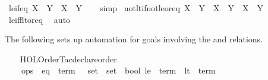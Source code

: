 \begin{isabellebody}
\isamarkupfalse%
\ le{\isacharunderscore}{\kern0pt}if{\isacharunderscore}{\kern0pt}eq{\isacharcolon}{\kern0pt}\ {\isachardoublequoteopen}X\ {\isacharequal}{\kern0pt}\ Y\ {\isasymLongrightarrow}\ X\ {\isasymle}\ Y{\isachardoublequoteclose}\isanewline
%
\isadelimproof
\ \ %
\endisadelimproof
%
\isatagproof
{}\isamarkupfalse%
\ simp%
\endisatagproof
{\isafoldproof}%
%
\isadelimproof
\isanewline
%
\endisadelimproof
\isanewline
{}\isamarkupfalse%
\ not{\isacharunderscore}{\kern0pt}lt{\isacharunderscore}{\kern0pt}if{\isacharunderscore}{\kern0pt}not{\isacharunderscore}{\kern0pt}le{\isacharunderscore}{\kern0pt}or{\isacharunderscore}{\kern0pt}eq{\isacharcolon}{\kern0pt}\ {\isachardoublequoteopen}{\isasymnot}{\isacharparenleft}{\kern0pt}X\ {\isacharless}{\kern0pt}\ Y{\isacharparenright}{\kern0pt}\ {\isasymlongleftrightarrow}\ {\isasymnot}{\isacharparenleft}{\kern0pt}X\ {\isasymle}\ Y{\isacharparenright}{\kern0pt}\ {\isasymor}\ X\ {\isacharequal}{\kern0pt}\ Y{\isachardoublequoteclose}\isanewline
%
\isadelimproof
\ \ %
\endisadelimproof
%
\isatagproof
{}\isamarkupfalse%
\ le{\isacharunderscore}{\kern0pt}iff{\isacharunderscore}{\kern0pt}lt{\isacharunderscore}{\kern0pt}or{\isacharunderscore}{\kern0pt}eq\ \isamarkupfalse%
\ auto%
\endisatagproof
{\isafoldproof}%
%
\isadelimproof
%
\endisadelimproof
%
\begin{isamarkuptext}%
The following sets up automation for goals involving the \isa{{\isacharparenleft}{\kern0pt}{\isasymle}{\isacharparenright}{\kern0pt}}
and \isa{{\isacharparenleft}{\kern0pt}{\isacharless}{\kern0pt}{\isacharparenright}{\kern0pt}} relations.%
\end{isamarkuptext}\isamarkuptrue%
%
\isadelimML
%
\endisadelimML
%
\isatagML
{}\isamarkupfalse%
\ {\isacartoucheopen}\isanewline
\ \ HOL{\isacharunderscore}{\kern0pt}Order{\isacharunderscore}{\kern0pt}Tac{\isachardot}{\kern0pt}declare{\isacharunderscore}{\kern0pt}order\ {\isacharbraceleft}{\kern0pt}\isanewline
\ \ \ \ ops\ {\isacharequal}{\kern0pt}\ {\isacharbraceleft}{\kern0pt}eq\ {\isacharequal}{\kern0pt}\ {\isacharat}{\kern0pt}{\isacharbraceleft}{\kern0pt}term\ {\isasymopen}{\isacharparenleft}{\kern0pt}{\isacharequal}{\kern0pt}{\isacharparenright}{\kern0pt}\ {\isacharcolon}{\kern0pt}{\isacharcolon}{\kern0pt}\ set\ {\isasymRightarrow}\ set\ {\isasymRightarrow}\ bool{\isasymclose}{\isacharbraceright}{\kern0pt}{\isacharcomma}{\kern0pt}\ le\ {\isacharequal}{\kern0pt}\ {\isacharat}{\kern0pt}{\isacharbraceleft}{\kern0pt}term\ {\isasymopen}{\isacharparenleft}{\kern0pt}{\isasymle}{\isacharparenright}{\kern0pt}{\isasymclose}{\isacharbraceright}{\kern0pt}{\isacharcomma}{\kern0pt}\ lt\ {\isacharequal}{\kern0pt}\ {\isacharat}{\kern0pt}{\isacharbraceleft}{\kern0pt}term\ {\isasymopen}{\isacharparenleft}{\kern0pt}{\isacharless}{\kern0pt}{\isacharparenright}{\kern0pt}{\isasymclose}{\isacharbraceright}{\kern0pt}{\isacharbraceright}{\kern0pt}{\isacharcomma}{\kern0pt}\isanewline

\end{isabellebody}
